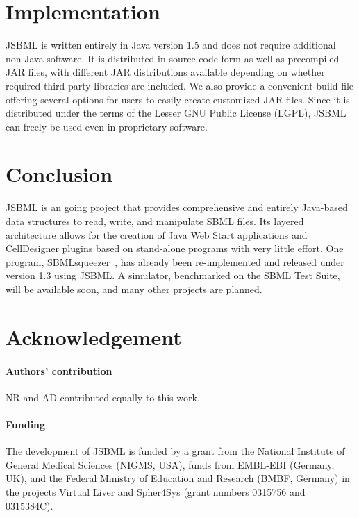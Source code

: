 \documentclass{bioinfo}
\begin{document}
\section{Implementation}

JSBML is written entirely in Java version 1.5 and does
not require additional non-Java software.
It is distributed in source-code form as well as precompiled JAR files,
with different JAR distributions available depending on whether required
third-party libraries are included. We also provide a convenient build
file offering several options for users to easily create customized JAR files.
Since it is distributed under the terms of the Lesser GNU Public License (LGPL), 
JSBML can freely be used even in proprietary software.



\section{Conclusion}

JSBML is an going project that provides comprehensive and
entirely Java-based data structures to read, write, and manipulate SBML files.
Its layered architecture allows for the creation of Java Web Start applications
and CellDesigner plugins based on stand-alone programs with very little effort.
%
One program, SBMLsqueezer~\citep{Draeger2008}, has already been re-implemented
and released under version 1.3 using JSBML. A simulator, benchmarked
on the SBML Test Suite, will be available soon, and many other projects are
planned.

\section*{Acknowledgement}

\paragraph{Authors' contribution\textcolon} NR and AD contributed equally to
this work.

\paragraph{Funding\textcolon}
The development of JSBML is funded by a grant from the National Institute of
General Medical Sciences (NIGMS, USA), funds from EMBL-EBI (Germany, UK), and
the Federal Ministry of Education and Research (BMBF, Germany) in the projects
Virtual Liver and Spher4Sys (grant numbers 0315756 and 0315384C).
\end{document}
